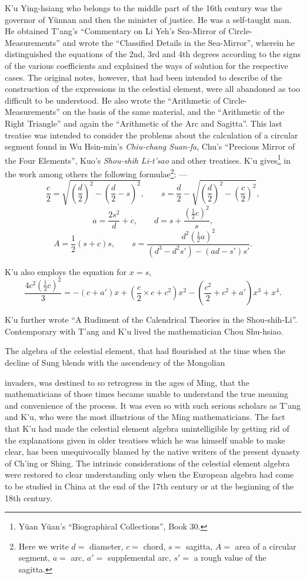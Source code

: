 \documentclass[11pt]{article}
\newcommand{\scanpage}[2]{\clearpage\setcounter{footnote}{0}\noindent{\footnotesize\color{gray}PDF page #1 · #2}\par\medskip}
\newcommand{\scanfooter}{}
\begin{document}
K'u Ying-hsiang who belongs to the middle part of the 16th century was the governor of Yünnan and then the minister of justice. He was a self-taught man. He obtained T'ang's ``Commentary on Li Yeh's Sea-Mirror of Circle-Measurements'' and wrote the ``Classified Details in the Sea-Mirror'', wherein he distinguished the equations of the 2nd, 3rd and 4th degrees according to the signs of the various coefficients and explained the ways of solution for the respective cases. The original notes, however, that had been intended to describe of the construction of the expressions in the celestial element, were all abandoned as too difficult to be understood. He also wrote the ``Arithmetic of Circle-Measurements'' on the basis of the same material, and the ``Arithmetic of the Right Triangle'' and again the ``Arithmetic of the Arc and Sagitta''. This last treatise was intended to consider the problems about the calculation of a circular segment found in Wu Hsin-min's \emph{Chiu-chang Suan-fa}, Chu's ``Precious Mirror of the Four Elements'', Kuo's \emph{Shou-shih Li-t'sao} and other treatises. K'u gives\footnote{Yüan Yüan's ``Biographical Collections'', Book 30.} in the work among others the following formulae\footnote{Here we write $d=$ diameter, $c=$ chord, $s=$ sagitta, $A=$ area of a circular segment, $a=$ arc, $a'=$ supplemental arc, $s'=$ a rough value of the sagitta.}: ---
\[
\frac{c}{2}=\sqrt{\left(\frac{d}{2}\right)^2-\left(\frac{d}{2}-s\right)^2},
\qquad
s=\frac{d}{2}-\sqrt{\left(\frac{d}{2}\right)^2-\left(\frac{c}{2}\right)^2},
\]
\[
a=\frac{2s^2}{d}+c,
\qquad
d=s+\frac{\left(\frac{1}{2}c\right)^2}{s},
\]
\[
A=\frac{1}{2}(s+c)s,
\qquad
s=\frac{d^2\left(\frac{1}{2}a\right)^2}{(d^3-d^2s')-(ad-s')s'}.
\]

K'u also employs the equation for $x=s$,
\[
\frac{4c^2\left(\frac{1}{2}c\right)^2}{3}
=-(c+a')x+\left(\frac{c}{2}\times c+c^2\right)x^2
-\left(\frac{c^2}{2}+c^2+a'\right)x^3+x^4.
\]

K'u further wrote ``A Rudiment of the Calendrical Theories in the Shou-shih-Li''. Contemporary with T'ang and K'u lived the mathematician Chou Shu-hsiao.

The algebra of the celestial element, that had flourished at the time when the decline of Sung blends with the ascendency of the Mongolian
\scanfooter

\scanpage{0124}{Chapter 16, printed page 110}
\setcounter{footnote}{0}
invaders, was destined to so retrogress in the ages of Ming, that the mathematicians of those times became unable to understand the true meaning and convenience of the process. It was even so with such serious scholars as T'ang and K'u, who were the most illustrious of the Ming mathematicians. The fact that K'u had made the celestial element algebra unintelligible by getting rid of the explanations given in older treatises which he was himself unable to make clear, has been unequivocally blamed by the native writers of the present dynasty of Ch'ing or Shing. The intrinsic considerations of the celestial element algebra were restored to clear understanding only when the European algebra had come to be studied in China at the end of the 17th century or at the beginning of the 18th century.
\end{document}
